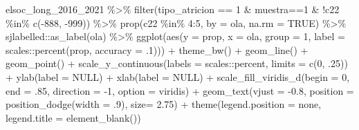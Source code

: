 \documentclass[
  12pt,
]{book}
\newenvironment{Shaded}{\begin{snugshade}}{\end{snugshade}}
\newcommand{\AttributeTok}[1]{\textcolor[rgb]{0.77,0.63,0.00}{#1}}
\newcommand{\ConstantTok}[1]{\textcolor[rgb]{0.00,0.00,0.00}{#1}}
\newcommand{\DecValTok}[1]{\textcolor[rgb]{0.00,0.00,0.81}{#1}}
\newcommand{\FloatTok}[1]{\textcolor[rgb]{0.00,0.00,0.81}{#1}}
\newcommand{\FunctionTok}[1]{\textcolor[rgb]{0.00,0.00,0.00}{#1}}
\newcommand{\NormalTok}[1]{#1}
\newcommand{\SpecialCharTok}[1]{\textcolor[rgb]{0.00,0.00,0.00}{#1}}
\newcommand{\StringTok}[1]{\textcolor[rgb]{0.31,0.60,0.02}{#1}}
\begin{document}
\begin{Shaded}
\begin{Highlighting}[]
\NormalTok{elsoc\_long\_2016\_2021 }\SpecialCharTok{\%\textgreater{}\%}
  \FunctionTok{filter}\NormalTok{(tipo\_atricion }\SpecialCharTok{==} \DecValTok{1} \SpecialCharTok{\&}\NormalTok{ muestra}\SpecialCharTok{==}\DecValTok{1} \SpecialCharTok{\&} \SpecialCharTok{!}\NormalTok{c22 }\SpecialCharTok{\%in\%} \FunctionTok{c}\NormalTok{(}\SpecialCharTok{{-}}\DecValTok{888}\NormalTok{, }\SpecialCharTok{{-}}\DecValTok{999}\NormalTok{)) }\SpecialCharTok{\%\textgreater{}\%}
  \FunctionTok{prop}\NormalTok{(c22 }\SpecialCharTok{\%in\%} \DecValTok{4}\SpecialCharTok{:}\DecValTok{5}\NormalTok{, }\AttributeTok{by  =}\NormalTok{ ola, }\AttributeTok{na.rm =} \ConstantTok{TRUE}\NormalTok{) }\SpecialCharTok{\%\textgreater{}\%}
\NormalTok{  sjlabelled}\SpecialCharTok{::}\FunctionTok{as\_label}\NormalTok{(ola) }\SpecialCharTok{\%\textgreater{}\%} 
  \FunctionTok{ggplot}\NormalTok{(}\FunctionTok{aes}\NormalTok{(}\AttributeTok{y =}\NormalTok{ prop, }\AttributeTok{x =}\NormalTok{ ola, }\AttributeTok{group =} \DecValTok{1}\NormalTok{, }
             \AttributeTok{label =}\NormalTok{ scales}\SpecialCharTok{::}\FunctionTok{percent}\NormalTok{(prop, }\AttributeTok{accuracy =}\NormalTok{ .}\DecValTok{1}\NormalTok{))) }\SpecialCharTok{+}
  \FunctionTok{theme\_bw}\NormalTok{() }\SpecialCharTok{+} 
  \FunctionTok{geom\_line}\NormalTok{() }\SpecialCharTok{+}
  \FunctionTok{geom\_point}\NormalTok{() }\SpecialCharTok{+}
  \FunctionTok{scale\_y\_continuous}\NormalTok{(}\AttributeTok{labels =}\NormalTok{ scales}\SpecialCharTok{::}\NormalTok{percent,}
                     \AttributeTok{limits =} \FunctionTok{c}\NormalTok{(}\DecValTok{0}\NormalTok{, .}\DecValTok{25}\NormalTok{)) }\SpecialCharTok{+}
  \FunctionTok{ylab}\NormalTok{(}\AttributeTok{label =} \ConstantTok{NULL}\NormalTok{) }\SpecialCharTok{+}
  \FunctionTok{xlab}\NormalTok{(}\AttributeTok{label =} \ConstantTok{NULL}\NormalTok{) }\SpecialCharTok{+}
  \FunctionTok{scale\_fill\_viridis\_d}\NormalTok{(}\AttributeTok{begin =} \DecValTok{0}\NormalTok{, }\AttributeTok{end =}\NormalTok{ .}\DecValTok{85}\NormalTok{, }\AttributeTok{direction =} \SpecialCharTok{{-}}\DecValTok{1}\NormalTok{, }\AttributeTok{option =} \StringTok{\textquotesingle{}viridis\textquotesingle{}}\NormalTok{) }\SpecialCharTok{+}
  \FunctionTok{geom\_text}\NormalTok{(}\AttributeTok{vjust =} \SpecialCharTok{{-}}\FloatTok{0.8}\NormalTok{,}
            \AttributeTok{position =} \FunctionTok{position\_dodge}\NormalTok{(}\AttributeTok{width =}\NormalTok{ .}\DecValTok{9}\NormalTok{),}
            \AttributeTok{size=} \FloatTok{2.75}\NormalTok{) }\SpecialCharTok{+}
  \FunctionTok{theme}\NormalTok{(}\AttributeTok{legend.position =} \StringTok{\textquotesingle{}none\textquotesingle{}}\NormalTok{,   }
        \AttributeTok{legend.title =} \FunctionTok{element\_blank}\NormalTok{())}
\end{Highlighting}
\end{Shaded}
\end{document}
